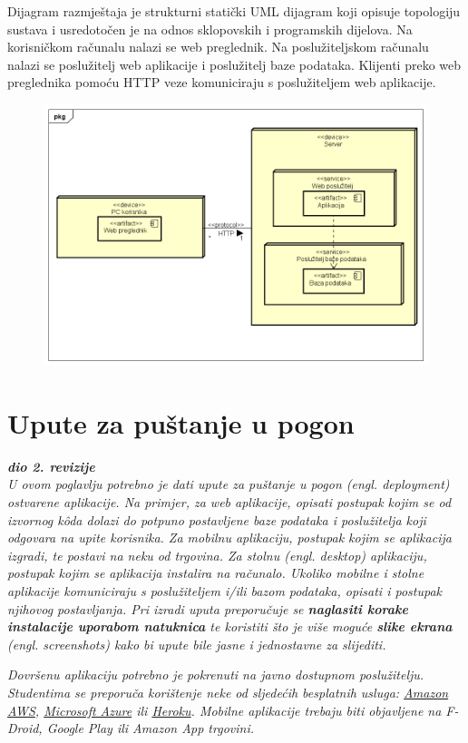 \noindent Dijagram razmještaja je strukturni statički UML dijagram koji opisuje topologiju sustava i usredotočen je na odnos sklopovskih i programskih dijelova. Na korisničkom računalu nalazi se web preglednik. Na poslužiteljskom računalu nalazi se poslužitelj web aplikacije i poslužitelj baze podataka. Klijenti preko web preglednika pomoću HTTP veze komuniciraju s poslužiteljem web aplikacije.

\begin{figure}[H]
	\includegraphics[scale=0.5]{slike/dijagram_razmjestaja.PNG} %
	\centering
\end{figure}

\eject 

\section{Upute za puštanje u pogon}

\textbf{\textit{dio 2. revizije}}\\

\textit{U ovom poglavlju potrebno je dati upute za puštanje u pogon (engl. deployment) ostvarene aplikacije. Na primjer, za web aplikacije, opisati postupak kojim se od izvornog kôda dolazi do potpuno postavljene baze podataka i poslužitelja koji odgovara na upite korisnika. Za mobilnu aplikaciju, postupak kojim se aplikacija izgradi, te postavi na neku od trgovina. Za stolnu (engl. desktop) aplikaciju, postupak kojim se aplikacija instalira na računalo. Ukoliko mobilne i stolne aplikacije komuniciraju s poslužiteljem i/ili bazom podataka, opisati i postupak njihovog postavljanja. Pri izradi uputa preporučuje se \textbf{naglasiti korake instalacije uporabom natuknica} te koristiti što je više moguće \textbf{slike ekrana} (engl. screenshots) kako bi upute bile jasne i jednostavne za slijediti.}


\textit{Dovršenu aplikaciju potrebno je pokrenuti na javno dostupnom poslužitelju. Studentima se preporuča korištenje neke od sljedećih besplatnih usluga: \href{https://aws.amazon.com/}{Amazon AWS}, \href{https://azure.microsoft.com/en-us/}{Microsoft Azure} ili \href{https://www.heroku.com/}{Heroku}. Mobilne aplikacije trebaju biti objavljene na F-Droid, Google Play ili Amazon App trgovini.}


\eject 